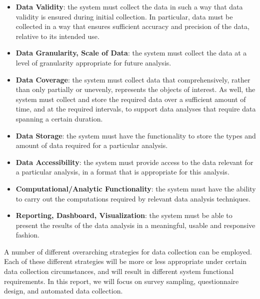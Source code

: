 \begin{itemize}[noitemsep]
\item \textbf{Data Validity}: the system must collect the data in such a way that data validity is ensured during initial collection. In particular, data must be collected in a way that ensures sufficient accuracy and precision of the data, relative to its intended use.
\item \textbf{Data Granularity, Scale of Data}: the system must collect the data at a level of granularity appropriate for future analysis.
\item \textbf{Data Coverage}: the system must collect data that comprehensively, rather than only partially or unevenly, represents the objects of interest. As well, the system must collect and store the required data over a sufficient amount of time, and at the required intervals, to support data analyses that require data spanning a certain duration.
\item \textbf{Data Storage}: the system must have the functionality to store the types and amount of data required for a particular analysis.
\item \textbf{Data Accessibility}: the system must provide access to the data relevant for a particular analysis, in a format that is appropriate for this analysis.
\item \textbf{Computational/Analytic Functionality}: the system must have the ability to carry out the computations required by relevant data analysis techniques.
\item \textbf{Reporting, Dashboard, Visualization}: the system must be able to present the results of the data analysis in a meaningful, usable and responsive fashion.
\end{itemize} 
A number of different overarching strategies for data collection can be employed. Each of these different strategies will be more or less appropriate under certain data collection circumstances, and will result in different system functional requirements. In this report, we will focus on survey sampling, questionnaire design, and automated data collection. 
